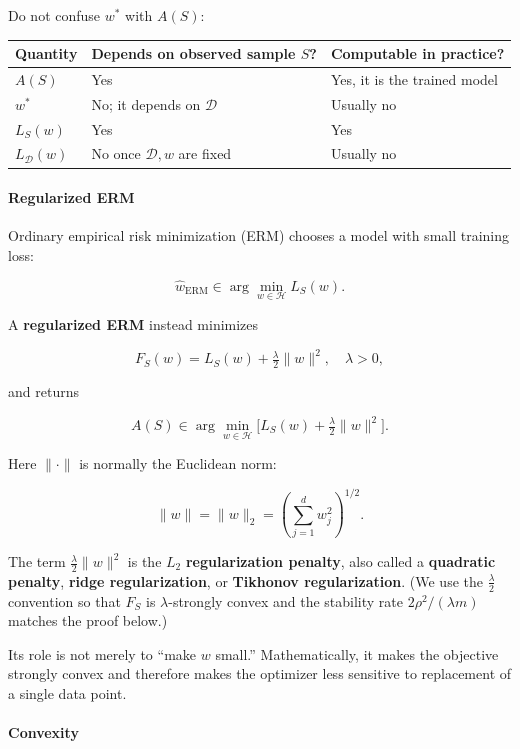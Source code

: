 \documentclass[11pt,a4paper]{article}
\theoremstyle{definition}
\begin{document}
Do not confuse $w^*$ with $A(S)$:

\begin{center}
\begin{tabular}{|l|l|l|}
\hline
\textbf{Quantity} & \textbf{Depends on observed sample $S$?} & \textbf{Computable in practice?} \\ \hline
$A(S)$ & Yes & Yes, it is the trained model \\ \hline
$w^*$ & No; it depends on $\mathcal{D}$ & Usually no \\ \hline
$L_S(w)$ & Yes & Yes \\ \hline
$L_{\mathcal{D}}(w)$ & No once $\mathcal{D}, w$ are fixed & Usually no \\ \hline
\end{tabular}
\end{center}


\paragraph{Regularized ERM}

Ordinary empirical risk minimization (ERM) chooses a model with small training loss:

\[
\widehat{w}_{\text{ERM}} \in \arg \min_{w \in \mathcal{H}} L_S(w).
\]

A \textbf{regularized ERM} instead minimizes

\[
\boxed{F_S(w) = L_S(w) + \tfrac{\lambda}{2} \|w\|^2, \quad \lambda > 0,}
\]

and returns

\[
\boxed{A(S) \in \arg \min_{w \in \mathcal{H}} \bigl[L_S(w) + \tfrac{\lambda}{2} \|w\|^2\bigr].} \tag{RERM}
\]

Here $\|\cdot\|$ is normally the Euclidean norm:

\[
\|w\| = \|w\|_2 = \left( \sum_{j=1}^d w_j^2 \right)^{1/2}.
\]

The term $\tfrac{\lambda}{2} \|w\|^2$
is the $L_2$ \textbf{regularization penalty}, also called a \textbf{quadratic penalty}, \textbf{ridge regularization}, or \textbf{Tikhonov regularization}.
(We use the $\tfrac{\lambda}{2}$ convention so that $F_S$ is $\lambda$-strongly convex and the stability rate $2\rho^{2}/(\lambda m)$ matches the proof below.)

Its role is not merely to ``make $w$ small.'' Mathematically, it makes the objective strongly convex and therefore makes the optimizer less sensitive to replacement of a single data point.

\paragraph{Convexity}
\end{document}
